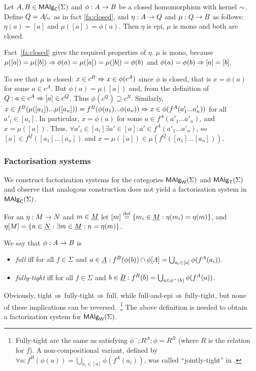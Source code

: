 \documentclass[10pt]{article}
\begin{document}
\begin{Prop}
\label{th:epimonoC}
Let $A,B \in \mbox{\rm\sf MAlg}_{\sf C}(\Sigma)$ and $\phi: A \rightarrow B$ be a closed homomorphism
with kernel $\sim$. Define $Q=A\!{\textstyle /}\!_{\sim}$ as in fact \ref{fa:closed},
and $\eta: A \rightarrow Q$ and $\mu:
Q \rightarrow B$ as follows: $\eta(a) = [a]$ and
$\mu([a]) = \phi(a)$. Then $\eta$ is epi, $\mu$ is mono
and both are closed.
\end{Prop}

\begin{Proof}
Fact~\ref{fa:closed} gives the required properties of $\eta$.
$\mu$ is mono, because  $\mu([a])=\mu([b]) \Rightarrow
\phi(a)=\mu([a])=\mu([b])=\phi(b)$ and $\phi(a)=\phi(b)\Rightarrow
[a]=[b]$.

To see that $\mu$ is closed: $x\in c^B\Rightarrow x\in \phi(c^A)$ since
$\phi$ is closed, that is $x=\phi(a)$ for some $a\in c^A$. But
$\phi(a)=\mu([a])$ and, from the definition of $Q:a\in c^A \Rightarrow
[a]\in c^Q$. Thus $\phi(c^Q)\supseteq c^B$.
Similarly, $x\in
f^B(\mu([a_1])...\mu([a_n]))=f^B(\phi(a_1)...\phi(a_n))
\Rightarrow x\in \phi(f^A(a'_1...a'_n))$ for all $a'_i\in[a_i]$. 
In
particular, $x=\phi(a)$ for some $a\in f^A(a'_1...a'_n)$, and
$x=\mu([a])$. 
Thus, $\forall a'_i\in[a_i]\exists a'\in[a]:a'\in f^A(a'_1...a'_n)$,
so $[a]\in f^Q([a_1]...[a_n])$ and $x=\mu([a])\in \mu(f^Q([a_1]...[a_n]))$.
\end{Proof}

\subsubsection*{Factorisation systems}
We construct factorisation systems for the categories $\mbox{\rm\sf MAlg}_{\sf W}(\Sigma)$ and $\mbox{\rm\sf MAlg}_{\sf T}(\Sigma)$
and observe that analogous construction does not yield a factorisation
system in $\mbox{\rm\sf MAlg}_{\sf C}(\Sigma)$.

For an $\eta:M\rightarrow N$ and $m\in\underline {M}$ let $[m] \stackrel{{\rm \tiny{def}}}= \{m_i\in\underline {M}:\eta(m_i)=\eta(m)\}$, and $\eta[M]=\{n\in\underline {N}:\exists m\in\underline {M}: n=\eta(m)\}$.

\begin{Definition}
\label{de:jtight}
We say that  $\phi:A\rightarrow B$ is
\begin{itemize}\MyLPar
\item
{\em full} iff for all $f\in\Sigma$ and
$a\in\underline {A} : f^B(\phi(b)) \cap \phi[A] = \bigcup_{a_i\in [a]} \phi(f^A(a_i))$.
\item
{\em fully-tight} iff for all $f\in\Sigma$ and
$b\in\underline {B} : f^B(b) = \bigcup_{a\in \phi^{-}(b)} \phi(f^A(a))$.
\end{itemize}
\end{Definition}
%
Obviously, tight $\Rightarrow$ fully-tight $\Rightarrow$ full, while full-and-epi 
$\Rightarrow$ fully-tight, but none of these implications can be
reversed.~\footnote{Fully-tight are the same as satisfying
$\phi^-;R^A;\phi=R^B$ (where $R$ is the relation for $f$). A
non-compositional variant, defined by $\forall a:f^B(\phi(a)) =
\bigcup_{a_i\in [a]} \phi(f^A(a_i))$, was called ``jointly-tight'' in
\cite{c:132}.}  The above definition is needed to obtain a
factorization system for $\mbox{\rm\sf MAlg}_{\sf W}(\Sigma)$.
\end{document}
